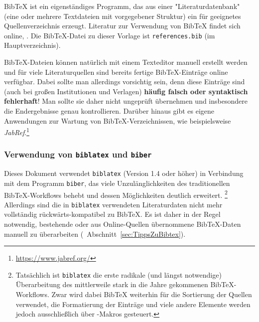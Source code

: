 BibTeX ist ein eigenständiges Programm, das aus einer "Literaturdatenbank" (eine oder mehrere
Textdateien mit vorgegebener Struktur) ein für \latex geeignetes Quellenverzeichnis
erzeugt. Literatur zur Verwendung von BibTeX findet sich online, \zB \cite{Feder2006, Patashnik1988}.
Die BibTeX-Datei zu dieser Vorlage ist \nolinkurl{references.bib} (im Hauptverzeichnis).

BibTeX-Dateien können natürlich mit einem Texteditor manuell erstellt werden und für
viele Literaturquellen sind bereits fertige BibTeX-Einträge online verfügbar.
Dabei sollte man allerdings vorsichtig sein, denn diese Einträge sind (auch bei großen
Institutionen und Verlagen) \textbf{häufig falsch oder syntaktisch fehlerhaft}!
Man sollte sie daher nicht ungeprüft übernehmen und insbesondere die Endergebnisse genau kontrollieren.
Darüber hinaus gibt es eigene Anwendungen zur Wartung von
BibTeX-Verzeichnissen, wie beispielsweise
\emph{JabRef}.\footnote{\url{https://www.jabref.org/}}


\subsubsection{Verwendung von \texttt{biblatex} und \texttt{biber}}

Dieses Dokument verwendet \texttt{biblatex} (Version 1.4 oder höher) in Verbindung
mit dem Programm \texttt{biber}, 
das viele Unzulänglichkeiten des traditionellen BibTeX-Work\-flows behebt und dessen Möglichkeiten deutlich erweitert.%
\footnote{Tatsächlich ist \texttt{biblatex} die erste radikale (und längst notwendige) Überarbeitung des mittlerweile stark in die Jahre gekommenen BibTeX-Workflows. Zwar wird dabei BibTeX weiterhin für 
die Sortierung der Quellen verwendet, die Formatierung der Einträge und viele andere Elemente werden jedoch ausschließlich über \latex-Makros gesteuert.}
Allerdings sind die in \texttt{biblatex} verwendeten Literaturdaten nicht mehr vollständig 
rückwärts-kompatibel zu BibTeX. Es ist daher in der Regel notwendig, bestehende oder aus
Online-Quellen übernommene BibTeX-Daten manuell zu überarbeiten (\sa\ Abschnitt~\ref{sec:TippsZuBibtex}).

